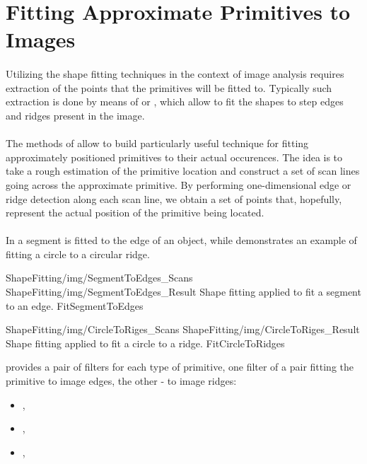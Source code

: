\section{Fitting Approximate Primitives to Images}

\paragraph*{}
Utilizing the shape fitting techniques in the context of image analysis requires extraction of the points that the primitives will be fitted to. Typically such extraction is done by means of  or , which allow to fit the shapes to step edges and ridges present in the image.

\paragraph*{}
The methods of  allow to build particularly useful technique for fitting approximately positioned primitives to their actual occurences. The idea is to take a rough estimation of the primitive location and construct a set of scan lines going across the approximate primitive. By performing one-dimensional edge or ridge detection along each scan line, we obtain a set of points that, hopefully, represent the actual position of the primitive being located.

\paragraph*{}
In  a segment is fitted to the edge of an object, while  demonstrates an example of fitting a circle to a circular ridge.

\twoFigures
{ShapeFitting/img/SegmentToEdges_Scans}
{ShapeFitting/img/SegmentToEdges_Result}
{Shape fitting applied to fit a segment to an edge.}
{FitSegmentToEdges}
{\basicWidth}

\twoFigures
{ShapeFitting/img/CircleToRiges_Scans}
{ShapeFitting/img/CircleToRiges_Result}
{Shape fitting applied to fit a circle to a ridge.}
{FitCircleToRidges}
{\basicWidth}

\begin{refImpl}
\studio provides a pair of filters for each type of primitive, one filter of a pair fitting the primitive to image edges, the other - to image ridges:
\begin{itemize}
	\item {}, 
	\item {}, 
	\item {}, 
\end{itemize}
\end{refImpl}